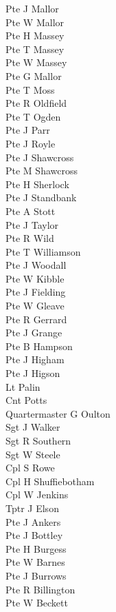\begin{multicols}{3}
  Pte J Mallor \\
  Pte W Mallor \\
  Pte H Massey \\
  Pte T Massey \\
  Pte W Massey \\
  Pte G Mallor \\
  Pte T Moss \\
  Pte R Oldfield \\
  Pte T Ogden \\
  Pte J Parr \\
  Pte J Royle \\
  Pte J Shawcross \\
  Pte M Shawcross \\
  Pte H Sherlock \\
  Pte J Standbank \\
  Pte A Stott \\
  Pte J Taylor \\
  Pte R Wild \\
  Pte T Williamson \\
  Pte J Woodall \\
  Pte W Kibble \\
  Pte J Fielding \\
  Pte W Gleave \\
  Pte R Gerrard \\
  Pte J Grange \\
  Pte B Hampson \\
  Pte J Higham \\
  Pte J Higson \\
  Lt Palin \\
  Cnt Potts \\
  Quartermaster G Oulton \\
  Sgt J Walker \\
  Sgt R Southern \\
  Sgt W Steele \\
  Cpl S Rowe \\
  Cpl H Shuffiebotham \\
  Cpl W Jenkins \\
  Tptr J Elson \\
  Pte J Ankers \\
  Pte J Bottley \\
  Pte H Burgess \\
  Pte W Barnes \\
  Pte J Burrows \\
  Pte R Billington \\
  Pte W Beckett \\

\end{multicols}
